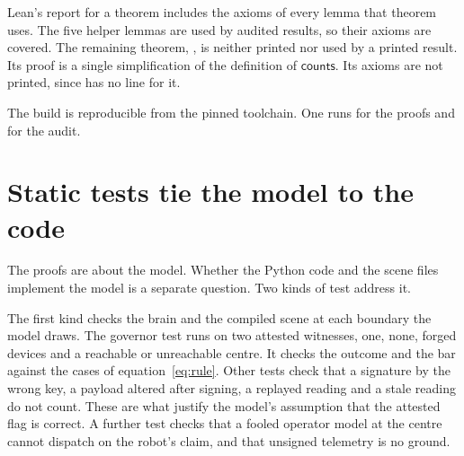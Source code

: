 Lean's report for a theorem includes the axioms of every lemma that theorem uses.
The five helper lemmas are used by audited results, so their axioms are covered.
The remaining theorem, , is neither printed nor used by a
printed result.
Its proof is a single simplification of the definition of $\mathsf{counts}$.
Its axioms are not printed, since  has no line for it.

The build is reproducible from the pinned toolchain.
One runs  for the proofs and  for the audit.

\section{Static tests tie the model to the code}\label{sec:lean-tests}

The proofs are about the model.
Whether the Python code and the scene files implement the model is a separate question.
Two kinds of test address it.

The first kind checks the brain and the compiled scene at each boundary the model draws.
The governor test runs  on two attested witnesses, one, none, forged devices
and a reachable or unreachable centre.
It checks the outcome and the bar against the cases of equation~\eqref{eq:rule}.
Other tests check that a signature by the wrong key, a payload altered after signing, a replayed
reading and a stale reading do not count.
These are what justify the model's assumption that the attested flag is correct.
A further test checks that a fooled operator model at the centre cannot dispatch on the robot's
claim, and that unsigned telemetry is no ground.

